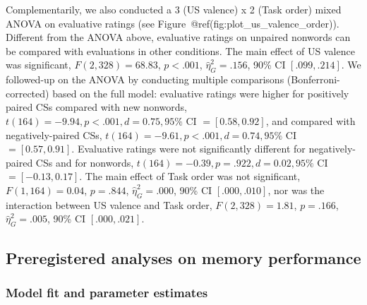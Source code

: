 \documentclass[
  man,floatsintext]{apa6}
\begin{document}
Complementarily, we also conducted a 3 (US valence) x 2 (Task order) mixed ANOVA on evaluative ratings (see Figure~@ref(fig:plot\_us\_valence\_order)). Different from the ANOVA above, evaluative ratings on unpaired nonwords can be compared with evaluations in other conditions. The main effect of US valence was significant, \(F(2, 328) = 68.83\), \(p < .001\), \(\hat{\eta}^2_G = .156\), 90\% CI \([.099, .214]\). We followed-up on the ANOVA by conducting multiple comparisons (Bonferroni-corrected) based on the full model: evaluative ratings were higher for positively paired CSs compared with new nonwords, \(t(164) = -9.94, p < .001, d = 0.75, 95\%\) CI \(= [0.58, 0.92]\), and compared with negatively-paired CSs, \(t(164) = -9.61, p < .001, d = 0.74, 95\%\) CI \(= [0.57, 0.91]\). Evaluative ratings were not significantly different for negatively-paired CSs and for nonwords, \(t(164) = -0.39, p = .922, d = 0.02, 95\%\) CI \(= [-0.13, 0.17]\). The main effect of Task order was not significant, \(F(1, 164) = 0.04\), \(p = .844\), \(\hat{\eta}^2_G = .000\), 90\% CI \([.000, .010]\), nor was the interaction between US valence and Task order, \(F(2, 328) = 1.81\), \(p = .166\), \(\hat{\eta}^2_G = .005\), 90\% CI \([.000, .021]\).

\hypertarget{preregistered-analyses-on-memory-performance}{%
\subsection{Preregistered analyses on memory performance}\label{preregistered-analyses-on-memory-performance}}

\hypertarget{model-fit-and-parameter-estimates}{%
\subsubsection{Model fit and parameter estimates}\label{model-fit-and-parameter-estimates}}
\end{document}
